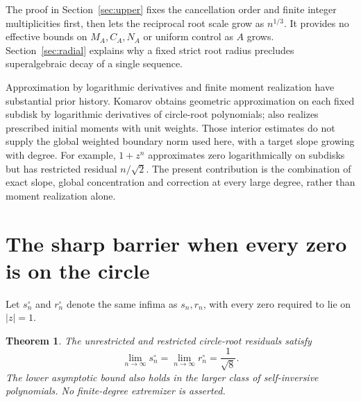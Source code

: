 \documentclass[11pt]{article}
\newtheorem{theorem}{Theorem}
\theoremstyle{remark}\newtheorem{remark}[theorem]{Remark}
\begin{document}
The proof in Section~\ref{sec:upper} fixes the cancellation order
and finite integer multiplicities first, then lets the reciprocal root
scale grow as \(n^{1/3}\). It provides no effective bounds on
\(M_A,C_A,N_A\) or uniform control as \(A\) grows.
Section~\ref{sec:radial} explains why a fixed strict root radius
precludes superalgebraic decay of a single sequence.

Approximation by logarithmic derivatives and finite moment realization
have substantial prior history. Komarov \cite{komarovrate} obtains
geometric approximation on each fixed subdisk by logarithmic
derivatives of circle-root polynomials; \cite{komarovmoments}
also realizes prescribed initial moments with unit weights.
Those interior estimates do not supply the global weighted boundary
norm used here, with a target slope growing with degree. For example,
\(1+z^n\) approximates zero logarithmically on subdisks but has
restricted residual \(n/\sqrt2\). The present contribution is the
combination of exact slope, global concentration and correction at
every large degree, rather than moment realization alone.


\section{The sharp barrier when every zero is on the circle}\label{sec:circle}
Let \(s_n^\circ\) and \(r_n^\circ\) denote the same infima as
\(s_n,r_n\), with every zero required to lie on \(|z|=1\).

\begin{theorem}\label{thm:circle}
The unrestricted and restricted circle-root residuals satisfy
\[
 \lim_{n\to\infty}s_n^\circ
 =\lim_{n\to\infty}r_n^\circ=\frac1{\sqrt8}.
\]
The lower asymptotic bound also holds in the larger class of
self-inversive polynomials. No finite-degree extremizer is asserted.
\end{theorem}
\end{document}
